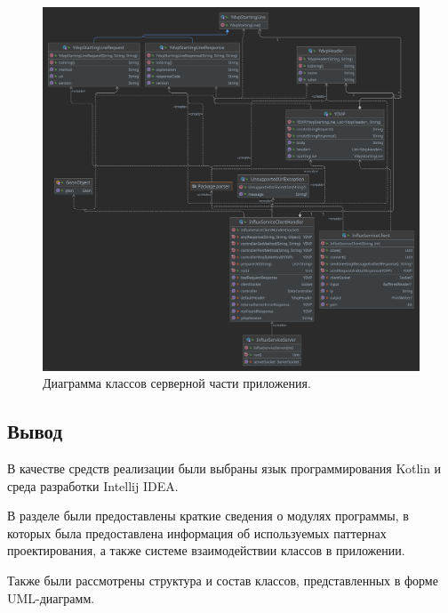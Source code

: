 \begin{figure}[H]
	\centering
	\includegraphics[width=\textwidth]{img/serverDiagram.png}
	\caption{Диаграмма классов серверной части приложения. }
	\label{fig:serverAndProtocol}
\end{figure}

\subsection*{Вывод}
В качестве средств реализации были выбраны язык программирования Kotlin и среда разработки Intellij IDEA.

В разделе были предоставлены краткие сведения о модулях программы, в которых была предоставлена информация об используемых паттернах проектирования, а также системе взаимодействии классов в приложении.

Также были рассмотрены структура и состав классов, представленных в форме UML-диаграмм.